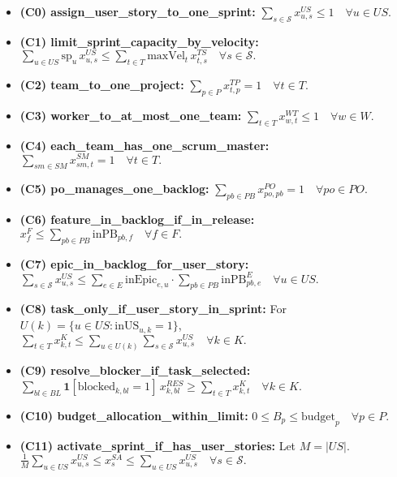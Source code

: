 \documentclass[11pt,a4paper]{article}
\begin{document}
\begin{itemize}
  \item \textbf{(C0) assign\_user\_story\_to\_one\_sprint:} \quad
  $\displaystyle \sum_{s \in \mathcal{S}} x^{US}_{u,s} \le 1 \quad \forall u \in US.$
  \item \textbf{(C1) limit\_sprint\_capacity\_by\_velocity:} \quad
  $\displaystyle \sum_{u \in US} \text{sp}_u \, x^{US}_{u,s} \le \sum_{t \in T} \text{maxVel}_t \, x^{TS}_{t,s} \quad \forall s \in \mathcal{S}.$
  \item \textbf{(C2) team\_to\_one\_project:} \quad
  $\displaystyle \sum_{p \in P} x^{TP}_{t,p} = 1 \quad \forall t \in T.$
  \item \textbf{(C3) worker\_to\_at\_most\_one\_team:} \quad
  $\displaystyle \sum_{t \in T} x^{WT}_{w,t} \le 1 \quad \forall w \in W.$
  \item \textbf{(C4) each\_team\_has\_one\_scrum\_master:} \quad
  $\displaystyle \sum_{sm \in SM} x^{SM}_{sm,t} = 1 \quad \forall t \in T.$
  \item \textbf{(C5) po\_manages\_one\_backlog:} \quad
  $\displaystyle \sum_{pb \in PB} x^{PO}_{po,pb} = 1 \quad \forall po \in PO.$
  \item \textbf{(C6) feature\_in\_backlog\_if\_in\_release:} \quad
  $\displaystyle x^{F}_{f} \le \sum_{pb \in PB} \text{inPB}_{pb,f} \quad \forall f \in F.$
  \item \textbf{(C7) epic\_in\_backlog\_for\_user\_story:} \quad
  $\displaystyle \sum_{s \in \mathcal{S}} x^{US}_{u,s} \le \sum_{e \in E} \text{inEpic}_{e,u} \cdot \sum_{pb \in PB} \text{inPB}^{E}_{pb,e} \quad \forall u \in US.$
  \item \textbf{(C8) task\_only\_if\_user\_story\_in\_sprint:} \quad
  For $U(k)=\{u \in US: \text{inUS}_{u,k}=1\}$, \ 
  $\displaystyle \sum_{t \in T} x^{K}_{k,t} \le \sum_{u \in U(k)} \sum_{s \in \mathcal{S}} x^{US}_{u,s} \quad \forall k \in K.$
  \item \textbf{(C9) resolve\_blocker\_if\_task\_selected:} \quad
  $\displaystyle \sum_{bl \in BL} \mathbf{1}[\text{blocked}_{k,bl}{=}1] \, x^{RES}_{k,bl} \ge \sum_{t \in T} x^{K}_{k,t} \quad \forall k \in K.$
  \item \textbf{(C10) budget\_allocation\_within\_limit:} \quad
  $\displaystyle 0 \le B_p \le \text{budget}_p \quad \forall p \in P.$
  \item \textbf{(C11) activate\_sprint\_if\_has\_user\_stories:} \quad
  Let $M=|US|$. \  $\displaystyle \frac{1}{M}\sum_{u \in US} x^{US}_{u,s} \le x^{SA}_{s} \le \sum_{u \in US} x^{US}_{u,s} \quad \forall s \in \mathcal{S}.$
\end{itemize}
\end{document}
